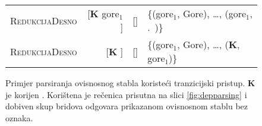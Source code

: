 \begin{figure}
\begin{tabular}{l|rlm{4cm}}
  \textsc{RedukcijaDesno}   & {[}\textbf{K} gore$_1$ {]}                          & {[}{]}                                                                      & \{(gore$_1$, Gore), \ldots, (gore$_1$, .~)\}  \\
  \textsc{RedukcijaDesno}   & {[}\textbf{K} {]}                                   & {[}{]}                                                                      & \{(gore$_1$, Gore), \ldots, (\textbf{K}, gore$_1$)\}  \\
  \end{tabular}
  \caption[Primjer parsiranja ovisnosnog stabla koristeći tranzicijski
  pristup.]{Primjer parsiranja ovisnosnog stabla koristeći tranzicijski pristup.
  \textbf{K} je korijen . Korištena je rečenica prisutna na slici
  \ref{fig:depparsing} i dobiven skup bridova odgovara prikazanom ovisnosnom
  stablu bez oznaka.}
  \label{fig:shiftreduce}
\end{figure}
